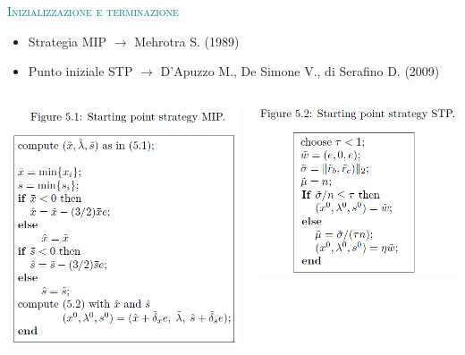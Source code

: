 \begin{frame}{\textcolor{teal}{\textsc{Inizializzazione e terminazione}}}
	\begin{itemize}
		\item Strategia MIP \pause $\rightarrow$ Mehrotra S. (1989)
		\pause
		\item Punto iniziale STP \pause $\rightarrow$ D’Apuzzo M., De Simone V., di Serafino D. (2009)
	\end{itemize}
\pause
\begin{columns}
	\begin{column}{0.4\textwidth}
		\includegraphics[width=\columnwidth]{MIP.jpg}
	\end{column}
	\begin{column}{0.4\textwidth}
	\includegraphics[width=\columnwidth]{STP.jpg}
\end{column}
\end{columns}
\end{frame}


